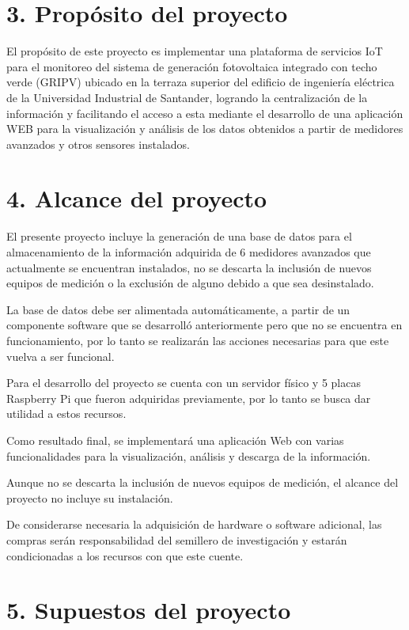 \documentclass[
11pt, %
codirector, %
]{charter}
\begin{document}
\section{3. Propósito del proyecto}
\label{sec:proposito}


El propósito de este proyecto es implementar una plataforma de servicios IoT para el monitoreo del sistema de generación fotovoltaica integrado con techo verde  (GRIPV) ubicado en la terraza superior del edificio de ingeniería eléctrica de la Universidad Industrial de Santander, logrando la centralización de la información y facilitando el acceso a esta mediante el desarrollo de una aplicación WEB para la visualización y análisis de los datos obtenidos a partir de medidores avanzados y otros sensores instalados. 


\section{4. Alcance del proyecto}
\label{sec:alcance}


El presente proyecto incluye la generación de una base de datos para el almacenamiento de la información adquirida de 6 medidores avanzados que actualmente se encuentran instalados, no se descarta la inclusión de nuevos equipos de medición o la exclusión de alguno debido a que sea desinstalado.

La base de datos debe ser alimentada automáticamente, a partir de un componente software que se desarrolló anteriormente pero que no se encuentra en funcionamiento, por lo tanto se realizarán las acciones necesarias para que este vuelva a ser funcional.

Para el desarrollo del proyecto se cuenta con un servidor físico y 5 placas Raspberry Pi que fueron adquiridas previamente, por lo tanto se busca dar utilidad a estos recursos.

Como resultado final, se implementará una aplicación Web con varias funcionalidades para la visualización, análisis y descarga de la información.

Aunque no se descarta la inclusión de nuevos equipos de medición, el alcance del proyecto no incluye su instalación.

De considerarse necesaria la adquisición de hardware o software adicional, las compras serán responsabilidad del semillero de investigación y estarán condicionadas a los recursos con que este cuente.



\section{5. Supuestos del proyecto}
\label{sec:supuestos}
\end{document}

